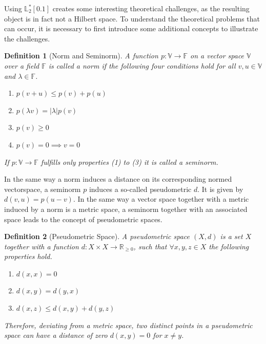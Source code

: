 \documentclass[12pt, a4paper]{article}
\theoremstyle{MAstyle} \newtheorem{assumption}{Assumption}[section]
\theoremstyle{MAstyle} \newtheorem{definition}{Definition}[section]
\theoremstyle{MAstyle} \newtheorem{theorem}{Theorem}[section]
\begin{document}
		Using $\mathbb{L}^{*}_2[0.1]$ creates some interesting theoretical challenges, as the resulting object is in fact not a Hilbert space. To understand the theoretical problems that can occur, it is necessary to first introduce some additional concepts to illustrate the challenges.
		\begin{definition}[Norm and Seminorm]
			A function $p : \mathbb{V} \rightarrow \mathbb{F}$ on a vector space $\mathbb{V}$ over a field $\mathbb{F}$ is called a norm if the following four conditions hold for all $v,u \in \mathbb{V}$ and $\lambda \in \mathbb{F}$.
			\begin{multicols}{2}
				\begin{enumerate}
					\item $p(v + u) \leq p(v) + p(u)$
					\item $p(\lambda v) = |\lambda| p(v)$
					\item $p(v) \geq 0$
					\item $p(v) = 0 \implies v = 0$
				\end{enumerate}
			\end{multicols}
			If $p : \mathbb{V} \rightarrow \mathbb{F}$ fulfills only properties (1) to (3) it is called a seminorm.
		\end{definition}
		
		In the same way a norm induces a distance on its corresponding normed vectorspace, a seminorm $p$ induces a so-called pseudometric $d$. It is given by $d(v,u) = p(u-v)$. In the same way a vector space together with a metric induced by a norm is a metric space, a seminorm together with an associated space leads to the concept of pseudometric spaces.

		\begin{definition}[Pseudometric Space]
			A pseudometric space $\left(X, d\right)$ is a set $X$ together with a function $d:X\times X \rightarrow \mathbb{R}_{\geq 0}$, such that $\forall x,y,z \in X$ the following properties hold.
			\begin{multicols}{2}
				\begin{enumerate}
					\item $d(x,x) = 0$
					\item $d(x,y) = d(y,x)$
					\item $d(x,z) \leq d(x,y) + d(y,z)$
				\end{enumerate}
			\end{multicols}
			Therefore, deviating from a metric space, two distinct points in a pseudometric space can have a distance of zero $d(x,y) = 0$ for $x \neq y$.
		\end{definition}
		
\end{document}
